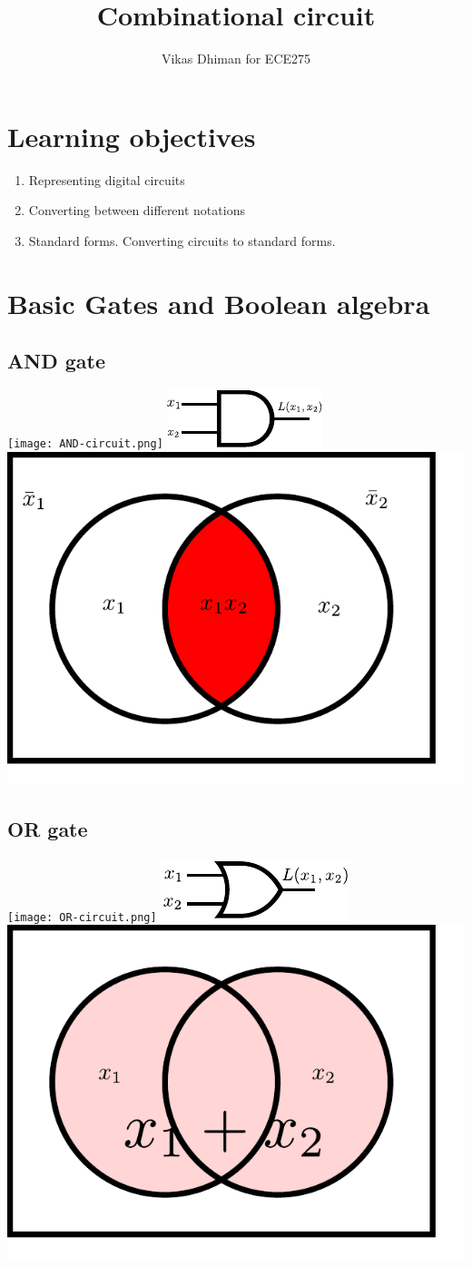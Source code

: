 \documentclass{article}
\title{Combinational circuit}
\author{Vikas Dhiman for ECE275}
\begin{document}
\maketitle
\section{Learning objectives}
\begin{enumerate}
\item Representing digital circuits
\item Converting between different notations
\item Standard forms. Converting circuits to standard forms.
\end{enumerate}

\section{Basic Gates and Boolean algebra}

\subsection{AND gate}
\texttt{[image: AND-circuit.png]}
\includegraphics[width=0.5\linewidth]{AND_ANSI.pdf}
\includegraphics[width=0.5\linewidth]{AND_Venn.pdf}
\subsection{OR gate}
\texttt{[image: OR-circuit.png]}
\includegraphics[width=0.5\linewidth]{OR_ANSI.pdf}
\includegraphics[width=0.5\linewidth]{OR_Venn.pdf}
\end{document}
